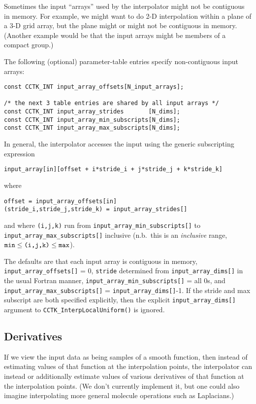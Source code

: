 Sometimes the input ``arrays'' used by the interpolator might not
be contiguous in memory.  For example, we might want to do 2-D interpolation
within a plane of a 3-D grid array, but the plane might or might not
be contiguous in memory.  (Another example would be that the input
arrays might be members of a compact group.)

The following (optional) parameter-table entries specify non-contiguous
input arrays:
\begin{verbatim}
const CCTK_INT input_array_offsets[N_input_arrays];

/* the next 3 table entries are shared by all input arrays */
const CCTK_INT input_array_strides       [N_dims];
const CCTK_INT input_array_min_subscripts[N_dims];
const CCTK_INT input_array_max_subscripts[N_dims];
\end{verbatim}

In general, the interpolator accesses the input using the generic
subscripting expression
\begin{verbatim}
input_array[in][offset + i*stride_i + j*stride_j + k*stride_k]
\end{verbatim}
where
\begin{verbatim}
offset = input_array_offsets[in]
(stride_i,stride_j,stride_k) = input_array_strides[]
\end{verbatim}
and where \verb|(i,j,k)| run from \verb|input_array_min_subscripts[]|
to \verb|input_array_max_subscripts[]| inclusive
(n.b.~this is an {\em inclusive\/} range, \ie{} 
$\verb|min| \le \verb|(i,j,k)| \le \verb|max|$).

The defaults are that each input array is contiguous in memory,
\ie{} \verb|input_array_offsets[]| = 0,
\verb|stride| determined from \verb|input_array_dims[]|
              in the usual Fortran manner,
\verb|input_array_min_subscripts[]| = all 0s, and
\verb|input_array_max_subscripts[]| = \verb|input_array_dims[]|-1.
If the stride and max subscript are both specified explicitly, then the
explicit \verb|input_array_dims[]| argument to
\verb|CCTK_InterpLocalUniform()| is ignored.


\subsection{Derivatives}
\label{AEIThorns/AEILocalInterp/sect-derivatives}

If we view the input data as being samples of a smooth function,
then instead of estimating values of that function at the interpolation
points, the interpolator can instead or additionally estimate values
of various derivatives of that function at the interpolation points.
(We don't currently implement it, but one could also imagine
interpolating more general molecule operations such as Laplacians.)

